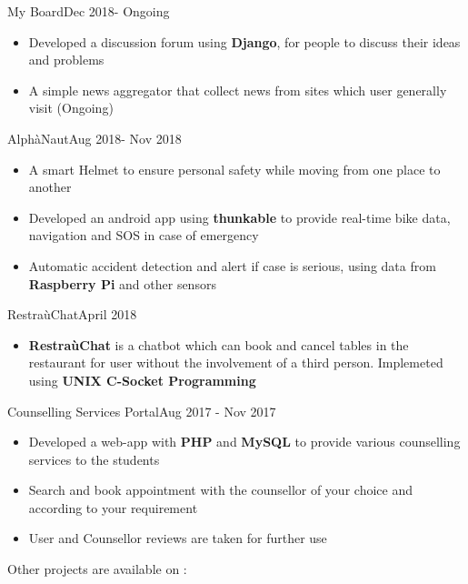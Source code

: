 
\begin{projects}
    \project
	{My Board}{Dec 2018- Ongoing}
	{}
	{
	    \begin{itemize}
	        \vspace{-5mm}
            \item Developed a discussion forum using \textbf{Django}, for people to discuss their ideas and problems
            \item A simple news aggregator that collect news from sites which user generally visit (Ongoing)
        \end{itemize}
	}

	\project
	{AlphàNaut}{Aug 2018- Nov 2018}
	{}
	{
	    \begin{itemize}
	        \vspace{-5mm}
            \item A smart Helmet to ensure personal safety while moving from one place to another
            \item Developed an android app using \textbf{thunkable} to provide real-time bike data, navigation and SOS in case of emergency
            \item Automatic accident detection and alert if case is serious, using data from \textbf{Raspberry Pi} and other sensors
        \end{itemize}
	}
	
	\project
	{RestraùChat}{April 2018}
	{}
	{
	    \begin{itemize}
	        \vspace{-5mm}
            \item \textbf{RestraùChat} is a chatbot which can book and cancel tables in the restaurant for user without the involvement of a third person. Implemeted using \textbf{UNIX C-Socket Programming}
        \end{itemize}
	}
	
	\project
	{Counselling Services Portal}{Aug 2017 - Nov 2017}
	{}
	{
	    \begin{itemize}
	        \vspace{-5mm}
            \item Developed a web-app with \textbf{PHP} and \textbf{MySQL} to provide various counselling services to the students
            \item Search and book appointment with the counsellor of your choice and according to your requirement
            \item User and Counsellor reviews are taken for further use
        \end{itemize}
	}
\end{projects}
\vspace{-5mm}
Other projects are available on : 